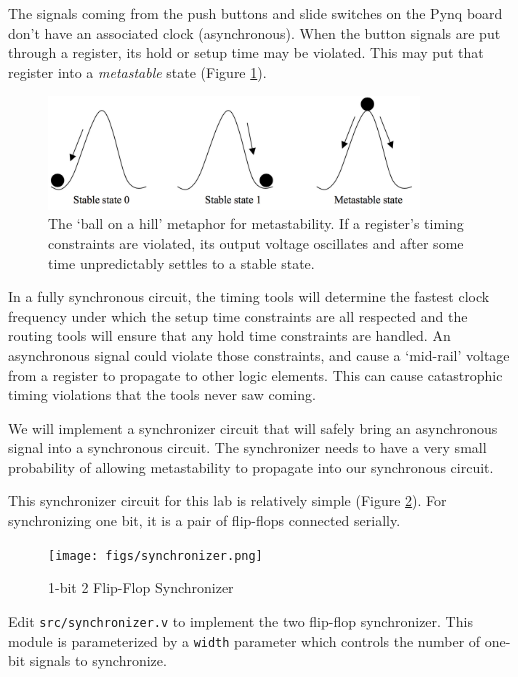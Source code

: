 \documentclass[11pt]{article}
\begin{document}
The signals coming from the push buttons and slide switches on the Pynq board don't have an associated clock (asynchronous).
When the button signals are put through a register, its hold or setup time may be violated.
This may put that register into a \textit{metastable} state (Figure \ref{fig:metastability}).

\begin{figure}
  \centerline{\includegraphics[height=3cm]{figs/metastability.png}}
  \caption{The `ball on a hill' metaphor for metastability. If a register's timing constraints are violated, its output voltage oscillates and after some time unpredictably settles to a stable state.}
  \label{fig:metastability}
\end{figure}

In a fully synchronous circuit, the timing tools will determine the fastest clock frequency under which the setup time constraints are all respected and the routing tools will ensure that any hold time constraints are handled.
An asynchronous signal could violate those constraints, and cause a `mid-rail' voltage from a register to propagate to other logic elements.
This can cause catastrophic timing violations that the tools never saw coming.

We will implement a synchronizer circuit that will safely bring an asynchronous signal into a synchronous circuit.
The synchronizer needs to have a very small probability of allowing metastability to propagate into our synchronous circuit.

This synchronizer circuit for this lab is relatively simple (Figure \ref{fig:synchronizer}).
For synchronizing one bit, it is a pair of flip-flops connected serially.

\begin{figure}[H]
  \vspace{0.5cm}
  \centerline{\texttt{[image: figs/synchronizer.png]}}
  \caption{1-bit 2 Flip-Flop Synchronizer}
  \label{fig:synchronizer}
\end{figure}

Edit \verb|src/synchronizer.v| to implement the two flip-flop synchronizer.
This module is parameterized by a \verb|width| parameter which controls the number of one-bit signals to synchronize.
\end{document}
